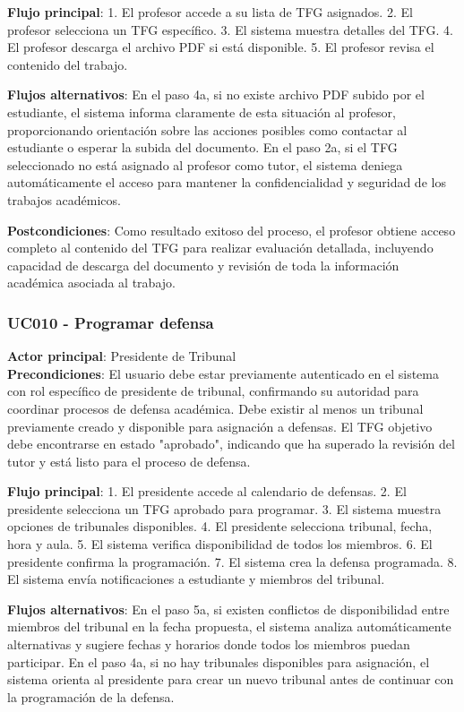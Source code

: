 \documentclass[12pt,a4paper,oneside]{report}
\begin{document}
\textbf{Flujo principal}: 1. El profesor accede a su lista de TFG
asignados. 2. El profesor selecciona un TFG específico. 3. El sistema
muestra detalles del TFG. 4. El profesor descarga el archivo PDF si está
disponible. 5. El profesor revisa el contenido del trabajo.

\textbf{Flujos alternativos}: En el paso 4a, si no existe archivo PDF subido por el estudiante, el sistema informa claramente de esta situación al profesor, proporcionando orientación sobre las acciones posibles como contactar al estudiante o esperar la subida del documento. En el paso 2a, si el TFG seleccionado no está asignado al profesor como tutor, el sistema deniega automáticamente el acceso para mantener la confidencialidad y seguridad de los trabajos académicos.

\textbf{Postcondiciones}: Como resultado exitoso del proceso, el profesor obtiene acceso completo al contenido del TFG para realizar evaluación detallada, incluyendo capacidad de descarga del documento y revisión de toda la información académica asociada al trabajo.

\subsubsection{UC010 - Programar
defensa}\label{uc010---programar-defensa}

\textbf{Actor principal}: Presidente de Tribunal\\
\textbf{Precondiciones}: El usuario debe estar previamente autenticado en el sistema con rol específico de presidente de tribunal, confirmando su autoridad para coordinar procesos de defensa académica. Debe existir al menos un tribunal previamente creado y disponible para asignación a defensas. El TFG objetivo debe encontrarse en estado "aprobado", indicando que ha superado la revisión del tutor y está listo para el proceso de defensa.

\textbf{Flujo principal}: 1. El presidente accede al calendario de
defensas. 2. El presidente selecciona un TFG aprobado para programar. 3.
El sistema muestra opciones de tribunales disponibles. 4. El presidente
selecciona tribunal, fecha, hora y aula. 5. El sistema verifica
disponibilidad de todos los miembros. 6. El presidente confirma la
programación. 7. El sistema crea la defensa programada. 8. El sistema
envía notificaciones a estudiante y miembros del tribunal.

\textbf{Flujos alternativos}: En el paso 5a, si existen conflictos de disponibilidad entre miembros del tribunal en la fecha propuesta, el sistema analiza automáticamente alternativas y sugiere fechas y horarios donde todos los miembros puedan participar. En el paso 4a, si no hay tribunales disponibles para asignación, el sistema orienta al presidente para crear un nuevo tribunal antes de continuar con la programación de la defensa.
\end{document}
